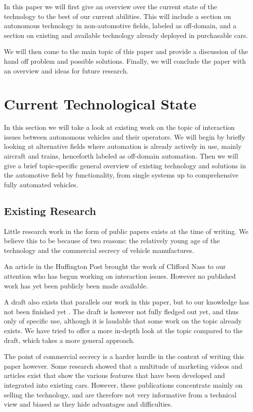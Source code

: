 \documentclass{acm_proc_article-sp}
\begin{document}
In this paper we will first give an overview over the current state of the technology to the best of our current abilities.
This will include a section on autonomous technology in non-automotive fields, labeled as off-domain, and a section on existing and available technology already deployed in purchasable cars.

We will then come to the main topic of this paper and provide a discussion of the hand off problem and possible solutions.
Finally, we will conclude the paper with an overview and ideas for future research.

\section{Current Technological State}

In this section we will take a look at existing work on the topic of interaction issues between autonomous vehicles and their operators.
We will begin by briefly looking at alternative fields where automation is already actively in use, mainly aircraft and trains, henceforth labeled as off-domain automation.
Then we will give a brief topic-specific general overview of existing technology and solutions in the automotive field by functionality, from single systems up to comprehensive fully automated vehicles.

\subsection{Existing Research}

Little research work in the form of public papers exists at the time of writing.
We believe this to be because of two reasons: the relatively young age of the technology and the commercial secrecy of vehicle manufactures.

An article in the Huffington Post \cite{www:huffington_post} brought the work of Clifford Nass to our attention who has begun working on interaction issues.
However no published work has yet been publicly been made available.

A draft also exists that parallels our work in this paper, but to our knowledge has not been finished yet \cite{cummings:authority}.
The draft is however not fully fledged out yet, and thus only of specific use, although it is laudable that some work on the topic already exists.
We have tried to offer a more in-depth look at the topic compared to the draft, which takes a more general approach.

The point of commercial secrecy is a harder hurdle in the context of writing this paper however.
Some research showed that a multitude of marketing videos and articles exist that show the various features that have been developed and integrated into existing cars.
However, these publications concentrate mainly on selling the technology, and are therefore not very informative from a technical view and biased as they hide advantages and difficulties.
\end{document}
